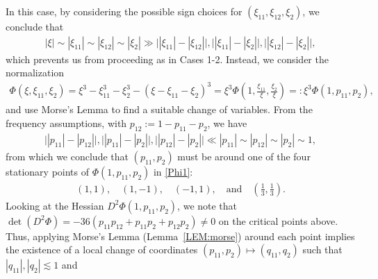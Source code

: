\documentclass[%
11pt,  reqno]{amsart}
\newcommand{\5}{\textup{V}}
\newcommand{\les}{\lesssim}
\theoremstyle{remark}
\newcommand{\ld}{\lambda}
\numberwithin{equation}{section}
\numberwithin{theorem}{section}
\begin{document}
In this case, by considering the possible sign choices for $(\xi_{11}, \xi_{12}, \xi_2)$, we conclude that
\begin{align}
|\xi| \sim |\xi_{11}| \sim |\xi_{12}| \sim |\xi_2| \gg \big| |\xi_{11}| -| \xi_{12}| \big|, \big| |\xi_{11}| -| \xi_{2}| \big|, \big| |\xi_{12}| -| \xi_{2}| \big| ,
\end{align}
which prevents us from proceeding as in Cases 1-2. Instead, we consider the normalization
\begin{align}\label{Phi1}
\Phi(\xi, \xi_{11}, \xi_2) = \xi^3 - \xi_{11}^3 - \xi_2^3 - (\xi - \xi_{11} - \xi_2)^3  = \xi^3 \Phi(1, \tfrac{\xi_{11}}{\xi}, \tfrac{\xi_2}{\xi}) =: \xi^3 \Phi(1, p_{11}, p_2), 
\end{align}
and use Morse's Lemma to find a suitable change of variables.
From the frequency assumptions, with $p_{12}:= 1 - p_{11} - p_2$, we have 
\begin{align}
\big| |p_{11}| - |p_{12}| \big|, 
\big| |p_{11}| - |p_2| \big|,
\big| |p_{12}| - |p_2| \big|
 \ll |p_{11}| \sim |p_{12} | \sim |p_2|  \sim 1, 
\end{align}
from which we conclude that 
$(p_{11}, p_2)$ must be around one of the four stationary points of $\Phi(1, p_{11}, p_2)$ in \eqref{Phi1}:
\begin{align}
(1, 1), 
\quad
(1, -1), 
\quad 
(-1,1), 
\quad 
\text{and}
\quad 
(\tfrac13, \tfrac13). 
\end{align}
Looking at the Hessian $D^2 \Phi(1, p_{11}, p_2)$, we note that $\det (D^2 \Phi) = -36 (p_{11} p_{12} + p_{11} p_2 + p_{12} p_2) \ne0 $ on the critical points above. Thus, applying Morse's Lemma (Lemma~\ref{LEM:morse}) around each point implies the existence of a local change of coordinates $(p_{11},p_2) \mapsto (q_{11}, q_2)$ such that $|q_{11}|, |q_2| \les 1$ and 
\end{document}
